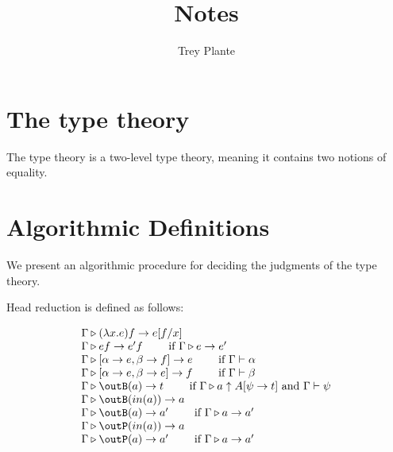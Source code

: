 \documentclass{article}
\author{Trey Plante}
\title{Notes}
\begin{document}
\maketitle
\tableofcontents

\section{The type theory}

The type theory is a two-level type theory, meaning it contains two notions of equality.

\section{Algorithmic Definitions}

We present an algorithmic procedure for deciding the judgments of the type theory.

\begin{definition}
  Head reduction is defined as follows:

  \[
    \begin{array}{lr}
      \Gamma \triangleright (\lambda x. e)f \rightarrow e[f/x] \\
      \Gamma \triangleright ef \to e'f \qquad \text{ if } \Gamma \triangleright e \to e' \\
      \Gamma \triangleright [\alpha \to e, \beta \to f] \rightarrow e \qquad \text{ if } \Gamma \vdash \alpha\\
      \Gamma \triangleright [\alpha \to e, \beta \to e] \rightarrow f \qquad \text{ if } \Gamma \vdash \beta\\
      \Gamma \triangleright \outB(a) \rightarrow t \qquad \text{ if } \Gamma \triangleright a \uparrow A[\psi \to t] \text{ and } \Gamma \vdash \psi \\
      \Gamma \triangleright \outB(in(a)) \rightarrow a \\
      \Gamma \triangleright \outB(a) \rightarrow a' \qquad \text{ if } \Gamma \triangleright a \rightarrow a' \\
      \Gamma \triangleright \outP(in(a)) \rightarrow a \\
      \Gamma \triangleright \outP(a) \rightarrow a' \qquad \text{ if  } \Gamma \triangleright a \rightarrow a'\\
    \end{array}
  \]
\end{definition}
\end{document}
